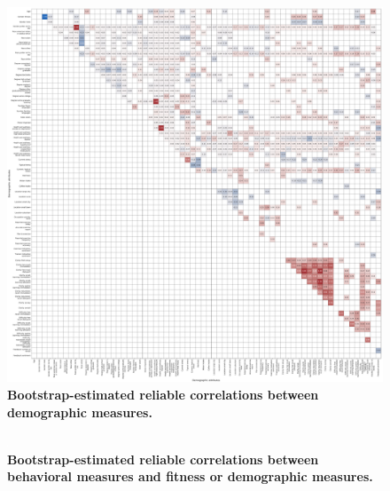 \documentclass[10pt]{article}
\begin{document}
\begin{figure}[p]
\centering
\includegraphics[width=\textwidth]{figs/survey_survey_correlations}
\caption{\textbf{Bootstrap-estimated reliable correlations between
    demographic measures.}}
\label{fig:survey_corrs}
\end{figure}

\begin{figure}
\centering
\includegraphics[width=\textwidth]{figs/behavior_fitness+survey_correlations}
\caption{\textbf{Bootstrap-estimated reliable correlations between
    behavioral measures and fitness or demographic measures.}}
\label{fig:fitness_survey_corrs}
\end{figure}
\end{document}
